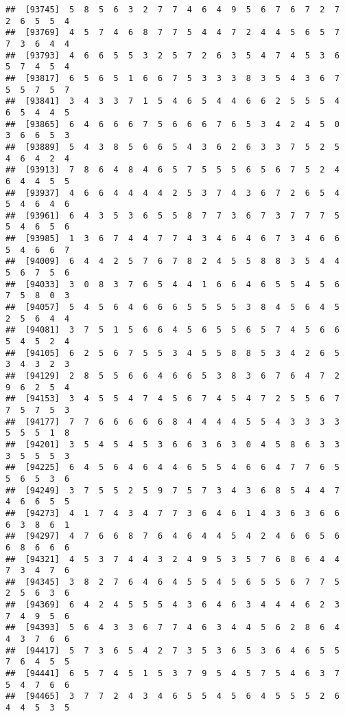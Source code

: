 \documentclass[
]{book}
\begin{document}
\begin{verbatim}
##  [93745]  5  8  5  6  3  2  7  7  4  6  4  9  5  6  7  6  7  2  7  2  6  5  5  4
##  [93769]  4  5  7  4  6  8  7  7  5  4  4  7  2  4  4  5  6  5  7  7  3  6  4  4
##  [93793]  4  6  6  5  5  3  2  5  7  2  6  3  5  4  7  4  5  3  6  5  7  4  5  4
##  [93817]  6  5  6  5  1  6  6  7  5  3  3  3  8  3  5  4  3  6  7  5  5  7  5  7
##  [93841]  3  4  3  3  7  1  5  4  6  5  4  4  6  6  2  5  5  5  4  6  5  4  4  5
##  [93865]  6  4  6  6  6  7  5  6  6  6  7  6  5  3  4  2  4  5  0  3  6  6  5  3
##  [93889]  5  4  3  8  5  6  6  5  4  3  6  2  6  3  3  7  5  2  5  4  6  4  2  4
##  [93913]  7  8  6  4  8  4  6  5  7  5  5  5  6  5  6  7  5  2  4  6  4  4  5  5
##  [93937]  4  6  6  4  4  4  4  2  5  3  7  4  3  6  7  2  6  5  4  5  4  6  4  6
##  [93961]  6  4  3  5  3  6  5  5  8  7  7  3  6  7  3  7  7  7  5  5  4  6  5  6
##  [93985]  1  3  6  7  4  4  7  7  4  3  4  6  4  6  7  3  4  6  6  5  4  6  6  7
##  [94009]  6  4  4  2  5  7  6  7  8  2  4  5  5  8  8  3  5  4  4  5  6  7  5  6
##  [94033]  3  0  8  3  7  6  5  4  4  1  6  6  4  6  5  5  4  5  6  7  5  8  0  3
##  [94057]  5  4  5  6  4  6  6  6  5  5  5  5  3  8  4  5  6  4  5  2  5  6  4  4
##  [94081]  3  7  5  1  5  6  6  4  5  6  5  5  6  5  7  4  5  6  6  5  4  5  2  4
##  [94105]  6  2  5  6  7  5  5  3  4  5  5  8  8  5  3  4  2  6  5  3  4  3  2  3
##  [94129]  2  8  5  5  6  6  4  6  6  5  3  8  3  6  7  6  4  7  2  9  6  2  5  4
##  [94153]  3  4  5  5  4  7  4  5  6  7  4  5  4  7  2  5  5  6  7  7  5  7  5  3
##  [94177]  7  7  6  6  6  6  6  8  4  4  4  4  5  5  4  3  3  3  3  5  5  5  1  8
##  [94201]  3  5  4  5  4  5  3  6  6  3  6  3  0  4  5  8  6  3  3  3  5  5  5  3
##  [94225]  6  4  5  6  4  6  4  4  6  5  5  4  6  6  4  7  7  6  5  5  6  5  3  6
##  [94249]  3  7  5  5  2  5  9  7  5  7  3  4  3  6  8  5  4  4  7  4  6  6  5  5
##  [94273]  4  1  7  4  3  4  7  7  3  6  4  6  1  4  3  6  3  6  6  6  3  8  6  1
##  [94297]  4  7  6  6  8  7  6  4  6  4  4  5  4  2  4  6  6  5  6  6  8  6  6  6
##  [94321]  4  5  3  7  4  4  3  2  4  9  5  3  5  7  6  8  6  4  4  7  3  4  7  6
##  [94345]  3  8  2  7  6  4  6  4  5  5  4  5  6  5  5  6  7  7  5  2  5  6  3  6
##  [94369]  6  4  2  4  5  5  5  4  3  6  4  6  3  4  4  4  6  2  3  7  4  9  5  6
##  [94393]  5  6  4  3  3  6  7  7  4  6  3  4  4  5  6  2  8  6  4  4  3  7  6  6
##  [94417]  5  7  3  6  5  4  2  7  3  5  3  6  5  3  6  4  6  5  5  7  6  4  5  5
##  [94441]  6  5  7  4  5  1  5  3  7  9  5  4  5  7  5  4  6  3  7  5  4  7  6  6
##  [94465]  3  7  7  2  4  3  4  6  5  5  4  5  6  4  5  5  5  2  6  4  4  5  3  5

\end{verbatim}
\end{document}
